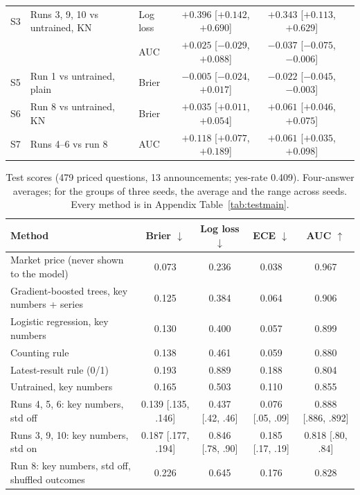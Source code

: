 \documentclass[11pt]{article}
\begin{document}
\begin{table}[t]
{\begin{tabular}{lllccc}
S3 & Runs 3, 9, 10 vs untrained, KN & Log loss & $\mathbf{+0.396}$ {\scriptsize[$+0.142$, $+0.690$]} & $\mathbf{+0.343}$ {\scriptsize[$+0.113$, $+0.629$]} &  \\
 &  & AUC & $+0.025$ {\scriptsize[$-0.029$, $+0.088$]} & $\mathbf{-0.037}$ {\scriptsize[$-0.075$, $-0.006$]} &  \\
S5 & Run 1 vs untrained, plain & Brier & $-0.005$ {\scriptsize[$-0.024$, $+0.017$]} & $\mathbf{-0.022}$ {\scriptsize[$-0.045$, $-0.003$]} &  \\
S6 & Run 8 vs untrained, KN & Brier & $\mathbf{+0.035}$ {\scriptsize[$+0.011$, $+0.054$]} & $\mathbf{+0.061}$ {\scriptsize[$+0.046$, $+0.075$]} &  \\
S7 & Runs 4--6 vs run 8 & AUC & $\mathbf{+0.118}$ {\scriptsize[$+0.077$, $+0.189$]} & $\mathbf{+0.061}$ {\scriptsize[$+0.035$, $+0.098$]} &  \\
\bottomrule
\end{tabular}}
\end{table}

\begin{table}[t]
\centering\small
\caption{Test scores (479 priced questions, 13 announcements; yes-rate 0.409). Four-answer averages; for the groups of three seeds, the average and the range across seeds. Every method is in Appendix Table~\ref{tab:testmain}.}
\label{tab:testscores}
\setlength{\tabcolsep}{4pt}
\begin{tabular}{lcccc}
\toprule
Method & Brier $\downarrow$ & Log loss $\downarrow$ & ECE $\downarrow$ & AUC $\uparrow$ \\
\midrule
Market price (never shown to the model) & 0.073 & 0.236 & 0.038 & 0.967 \\
Gradient-boosted trees, key numbers + series & 0.125 & 0.384 & 0.064 & 0.906 \\
Logistic regression, key numbers & 0.130 & 0.400 & 0.057 & 0.899 \\
Counting rule & 0.138 & 0.461 & 0.059 & 0.880 \\
Latest-result rule (0/1) & 0.193 & 0.889 & 0.188 & 0.804 \\
\midrule
Untrained, key numbers & 0.165 & 0.503 & 0.110 & 0.855 \\
Runs 4, 5, 6: key numbers, std off & 0.139 {\scriptsize[.135, .146]} & 0.437 {\scriptsize[.42, .46]} & 0.076 {\scriptsize[.05, .09]} & 0.888 {\scriptsize[.886, .892]} \\
Runs 3, 9, 10: key numbers, std on & 0.187 {\scriptsize[.177, .194]} & 0.846 {\scriptsize[.78, .90]} & 0.185 {\scriptsize[.17, .19]} & 0.818 {\scriptsize[.80, .84]} \\
Run 8: key numbers, std off, shuffled outcomes & 0.226 & 0.645 & 0.176 & 0.828 \\
\bottomrule
\end{tabular}
\end{table}
\end{document}

